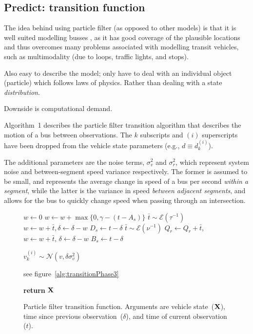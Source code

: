 \documentclass[draftcls,a4paper,onecolumn]{IEEEtran}\usepackage[]{graphicx}\usepackage[]{color}
\begin{document}
\subsection{Predict: transition function}
The idea behind using particle filter (as opposed to other models)
is that it is well suited modelling busses \cite{Hans_2015},
as it has good coverage of the plausible locations and thus overcomes
many problems associated with modelling transit vehicles,
such as multimodality (due to loops, traffic lights, and stops).

Also easy to describe the model;
only have to deal with an individual object (particle) which follows laws of physics.
Rather than dealing with a state \emph{distribution}.

Downside is computational demand.

Algorithm~1 describes the particle filter transition algorithm that
describes the motion of a bus between observations.
The $k$ subscripts and $(i)$ superscripts have been dropped from the
vehicle state parameters (e.g., $d \equiv d_k^{(i)}$).

The additional parameters are the noise terms, $\sigma_v^2$ and $\sigma_r^2$,
which represent system noise and between-segment speed variance respectively.
The former is assumed to be small, and represents the average change in speed
of a bus per second \emph{within a segment},
while the latter is the variance in speed \emph{between adjacent segments},
and allows for the bus to quickly change speed when passing through an intersection.


\begin{figure}[bt]
  \begin{algorithmic}
    
    \State $w\gets 0$
      \State $w\gets w + \max\{0, \gamma - (t - A_s)\}$
      \State $\bar t \sim \mathcal{E}(\tau^{-1})$
      \State $w\gets w + \bar t, \delta\gets \delta - w$
        \State $D_s\gets t - \delta$
      \EndIf
      \State $\bar t \sim \mathcal{E}(\nu^{-1})$
      \State $Q_r\gets Q_r + \bar t$, $w\gets w+\bar t$, $\delta\gets \delta - w$
        \State $B_s\gets t - \delta$
      \EndIf
    \EndIf
    \EndPhase
    
    
    \State $v_k^{(i)}\sim \mathcal{N}(v, \delta\sigma_v^2)$
    \EndPhase
    
    \State see figure~\ref{alg:transitionPhase3}
    \EndPhase
    
    \State \textbf{return} $\mathbf{X}$
    \EndFunction
  \end{algorithmic}
  \caption{Particle filter transition function. Arguments are vehicle state~($\mathbf{X}$), time since previous observation~($\delta$), and time of current observation ($t$).}
  \label{alg:transition}
\end{figure}
\end{document}

